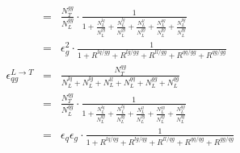 \documentclass[12pt,oneandhalf,chaparabic,phys,ms,eng]{metu}
\begin{document}
\begin{eqnarray}
& = & 
\frac{N_{T}^{gg}}{N_{L}^{gg}} \cdot \frac{1}{1 + \frac{N_{L}^{lq}}{N_{L}^{gg}} + \frac{N_{L}^{lg}}{N_{L}^{gg}} + \frac{N_{L}^{ll}}{N_{L}^{gg}} + \frac{N_{L}^{qq}}{N_{L}^{gg}} + \frac{N_{L}^{qg}}{N_{L}^{gg}}} \nonumber \\
& = & \epsilon_{g}^{2} \cdot \frac{1}{1 + R^{lq/gg} + R^{lg/gg} + R^{ll/gg} + R^{qq/gg} + R^{qg/gg}} \label{eq:eps15_}\\
\epsilon_{qg}^{L \rightarrow T} & = & \frac{N_{T}^{qg}}{N_{L}^{lq}+N_{L}^{lg}+N_{L}^{ll}+N_{L}^{qq}+N_{L}^{gg}+N_{L}^{qg}} \nonumber \\
& = & 
\frac{N_{T}^{qg}}{N_{L}^{qg}} \cdot \frac{1}{1 + \frac{N_{L}^{lq}}{N_{L}^{qg}} + \frac{N_{L}^{lg}}{N_{L}^{qg}} + \frac{N_{L}^{ll}}{N_{L}^{qg}} + \frac{N_{L}^{qq}}{N_{L}^{qg}} + \frac{N_{L}^{gg}}{N_{L}^{qg}}} \nonumber \\
& = & \epsilon_{q} \epsilon_{g} \cdot \frac{1}{1 + R^{lq/qg} + R^{lg/qg} + R^{ll/qg} + R^{qq/qg} + R^{gg/qg}} \label{eq:eps16_}
\end{eqnarray}
\end{document}

